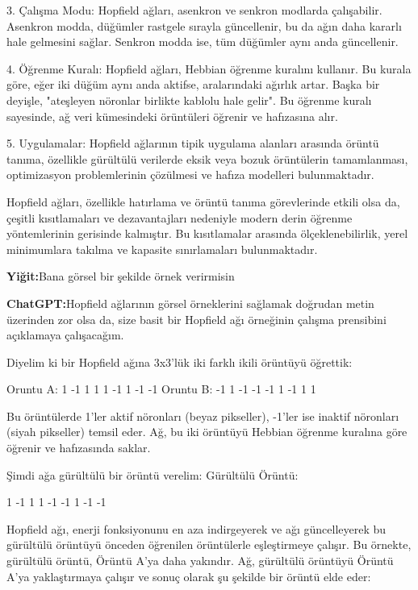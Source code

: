 \documentclass[11pt]{article}
\begin{document}
3. Çalışma Modu: Hopfield ağları, asenkron ve senkron modlarda çalışabilir. Asenkron modda, düğümler rastgele sırayla güncellenir, bu da ağın daha kararlı hale gelmesini sağlar. Senkron modda ise, tüm düğümler aynı anda güncellenir.

4. Öğrenme Kuralı: Hopfield ağları, Hebbian öğrenme kuralını kullanır. Bu kurala göre, eğer iki düğüm aynı anda aktifse, aralarındaki ağırlık artar. Başka bir deyişle, "ateşleyen nöronlar birlikte kablolu hale gelir". Bu öğrenme kuralı sayesinde, ağ veri kümesindeki örüntüleri öğrenir ve hafızasına alır.

5. Uygulamalar: Hopfield ağlarının tipik uygulama alanları arasında örüntü tanıma, özellikle gürültülü verilerde eksik veya bozuk örüntülerin tamamlanması, optimizasyon problemlerinin çözülmesi ve hafıza modelleri bulunmaktadır.

Hopfield ağları, özellikle hatırlama ve örüntü tanıma görevlerinde etkili olsa da, çeşitli kısıtlamaları ve dezavantajları nedeniyle modern derin öğrenme yöntemlerinin gerisinde kalmıştır. Bu kısıtlamalar arasında ölçeklenebilirlik, yerel minimumlara takılma ve kapasite sınırlamaları bulunmaktadır.

\textbf{Yiğit:}Bana görsel bir şekilde örnek verirmisin

\textbf{ChatGPT:}Hopfield ağlarının görsel örneklerini sağlamak doğrudan metin üzerinden zor olsa da, size basit bir Hopfield ağı örneğinin çalışma prensibini açıklamaya çalışacağım.

Diyelim ki bir Hopfield ağına 3x3'lük iki farklı ikili örüntüyü öğrettik:

\begin{python}
Oruntu A:
1 -1  1
1  1 -1
1 -1 -1
Oruntu B:
-1  1 -1
-1 -1  1
-1  1  1
\end{python}

Bu örüntülerde 1'ler aktif nöronları (beyaz pikseller), -1'ler ise inaktif nöronları (siyah pikseller) temsil eder. Ağ, bu iki örüntüyü Hebbian öğrenme kuralına göre öğrenir ve hafızasında saklar.

Şimdi ağa gürültülü bir örüntü verelim: Gürültülü Örüntü:

\begin{python}
1 -1  1
1 -1 -1
1 -1 -1
\end{python}

Hopfield ağı, enerji fonksiyonunu en aza indirgeyerek ve ağı güncelleyerek bu gürültülü örüntüyü önceden öğrenilen örüntülerle eşleştirmeye çalışır. Bu örnekte, gürültülü örüntü, Örüntü A'ya daha yakındır. Ağ, gürültülü örüntüyü Örüntü A'ya yaklaştırmaya çalışır ve sonuç olarak şu şekilde bir örüntü elde eder:
\end{document}
